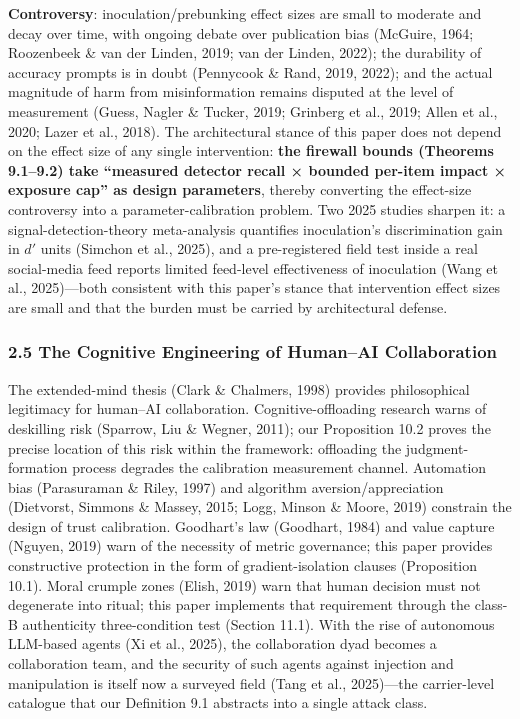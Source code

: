 \documentclass[
  11pt]{article}
\begin{document}
\textbf{Controversy}: inoculation/prebunking effect sizes are small to
moderate and decay over time, with ongoing debate over publication bias
(McGuire, 1964; Roozenbeek \& van der Linden, 2019; van der Linden,
2022); the durability of accuracy prompts is in doubt (Pennycook \&
Rand, 2019, 2022); and the actual magnitude of harm from misinformation
remains disputed at the level of measurement (Guess, Nagler \& Tucker,
2019; Grinberg et al., 2019; Allen et al., 2020; Lazer et al., 2018).
The architectural stance of this paper does not depend on the effect
size of any single intervention: \textbf{the firewall bounds (Theorems
9.1--9.2) take ``measured detector recall × bounded per-item impact ×
exposure cap'' as design parameters}, thereby converting the effect-size
controversy into a parameter-calibration problem. Two 2025 studies
sharpen it: a signal-detection-theory meta-analysis quantifies
inoculation's discrimination gain in \(d'\) units (Simchon et al.,
2025), and a pre-registered field test inside a real social-media feed
reports limited feed-level effectiveness of inoculation (Wang et al.,
2025)---both consistent with this paper's stance that intervention
effect sizes are small and that the burden must be carried by
architectural defense.

\subsubsection{2.5 The Cognitive Engineering of Human--AI
Collaboration}\label{the-cognitive-engineering-of-humanai-collaboration}

The extended-mind thesis (Clark \& Chalmers, 1998) provides
philosophical legitimacy for human--AI collaboration.
Cognitive-offloading research warns of deskilling risk (Sparrow, Liu \&
Wegner, 2011); our Proposition 10.2 proves the precise location of this
risk within the framework: offloading the judgment-formation process
degrades the calibration measurement channel. Automation bias
(Parasuraman \& Riley, 1997) and algorithm aversion/appreciation
(Dietvorst, Simmons \& Massey, 2015; Logg, Minson \& Moore, 2019)
constrain the design of trust calibration. Goodhart's law (Goodhart,
1984) and value capture (Nguyen, 2019) warn of the necessity of metric
governance; this paper provides constructive protection in the form of
gradient-isolation clauses (Proposition 10.1). Moral crumple zones
(Elish, 2019) warn that human decision must not degenerate into ritual;
this paper implements that requirement through the class-B authenticity
three-condition test (Section 11.1). With the rise of autonomous
LLM-based agents (Xi et al., 2025), the collaboration dyad becomes a
collaboration team, and the security of such agents against injection
and manipulation is itself now a surveyed field (Tang et al.,
2025)---the carrier-level catalogue that our Definition 9.1 abstracts
into a single attack class.
\end{document}
